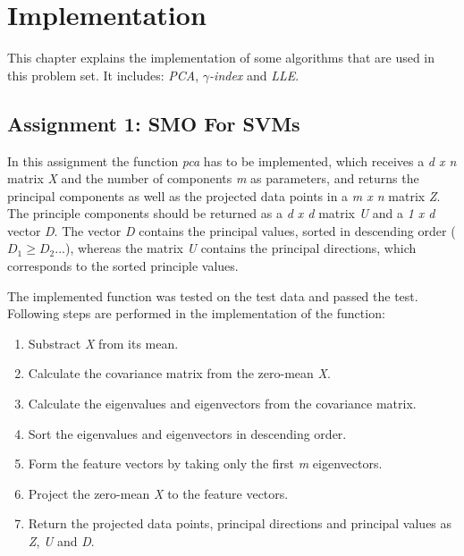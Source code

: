 \chapter{Implementation}
\label{chap:implementation}

This chapter explains the implementation of some algorithms that are used in this problem set. It includes: \textit{PCA}, \textit{$\gamma$-index} and \textit{LLE}.

\section{Assignment 1: SMO For SVMs}
\label{sec:assignment1}

In this assignment the function \textit{pca} has to be implemented, which receives a \textit{d x n} matrix \textit{X} and the number of components \textit{m} as parameters, and returns the principal components as well as the projected data points in a \textit{m x n} matrix \textit{Z}. The principle components should be returned as a \textit{d x d} matrix \textit{U} and a \textit{1 x d} vector \textit{D}. The vector \textit{D} contains the principal values, sorted in descending order ($D_1 \geq D_2 ...$), whereas the matrix \textit{U} contains the principal directions, which corresponds to the sorted principle values.

The implemented function was tested on the test data and passed the test. Following steps are performed in the implementation of the function:
\begin{enumerate}
	\item Substract \textit{X} from its mean.
	\item Calculate the covariance matrix from the zero-mean \textit{X}.
	\item Calculate the eigenvalues and eigenvectors from the covariance matrix.
	\item Sort the eigenvalues and eigenvectors in descending order.
	\item Form the feature vectors by taking only the first \textit{m} eigenvectors.
	\item Project the zero-mean \textit{X} to the feature vectors.
	\item Return the projected data points, principal directions and principal values as \textit{Z}, \textit{U} and \textit{D}.
\end{enumerate}

